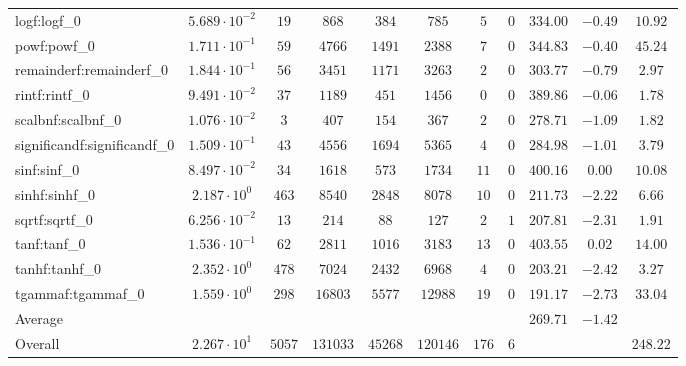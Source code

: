 \begin{tabular}{|l|c|c|c|c|c|c|c|c|c|c|}
logf:logf\_0                 & $ 5.689 \cdot 10^{-2} $ & $ 19     $ & $ 868    $ & $ 384   $ & $ 785    $ & $ 5   $ & $ 0 $ & $ 334.00      $ & $ -0.49   $ & $ 10.92   $ \\
powf:powf\_0                 & $ 1.711 \cdot 10^{-1} $ & $ 59     $ & $ 4766   $ & $ 1491  $ & $ 2388   $ & $ 7   $ & $ 0 $ & $ 344.83      $ & $ -0.40   $ & $ 45.24   $ \\
remainderf:remainderf\_0     & $ 1.844 \cdot 10^{-1} $ & $ 56     $ & $ 3451   $ & $ 1171  $ & $ 3263   $ & $ 2   $ & $ 0 $ & $ 303.77      $ & $ -0.79   $ & $ 2.97    $ \\
rintf:rintf\_0               & $ 9.491 \cdot 10^{-2} $ & $ 37     $ & $ 1189   $ & $ 451   $ & $ 1456   $ & $ 0   $ & $ 0 $ & $ 389.86      $ & $ -0.06   $ & $ 1.78    $ \\
scalbnf:scalbnf\_0           & $ 1.076 \cdot 10^{-2} $ & $ 3      $ & $ 407    $ & $ 154   $ & $ 367    $ & $ 2   $ & $ 0 $ & $ 278.71      $ & $ -1.09   $ & $ 1.82    $ \\
significandf:significandf\_0 & $ 1.509 \cdot 10^{-1} $ & $ 43     $ & $ 4556   $ & $ 1694  $ & $ 5365   $ & $ 4   $ & $ 0 $ & $ 284.98      $ & $ -1.01   $ & $ 3.79    $ \\
sinf:sinf\_0                 & $ 8.497 \cdot 10^{-2} $ & $ 34     $ & $ 1618   $ & $ 573   $ & $ 1734   $ & $ 11  $ & $ 0 $ & $ 400.16      $ & $ 0.00    $ & $ 10.08   $ \\
sinhf:sinhf\_0               & $ 2.187 \cdot 10^{0}  $ & $ 463    $ & $ 8540   $ & $ 2848  $ & $ 8078   $ & $ 10  $ & $ 0 $ & $ 211.73      $ & $ -2.22   $ & $ 6.66    $ \\
sqrtf:sqrtf\_0               & $ 6.256 \cdot 10^{-2} $ & $ 13     $ & $ 214    $ & $ 88    $ & $ 127    $ & $ 2   $ & $ 1 $ & $ 207.81      $ & $ -2.31   $ & $ 1.91    $ \\
tanf:tanf\_0                 & $ 1.536 \cdot 10^{-1} $ & $ 62     $ & $ 2811   $ & $ 1016  $ & $ 3183   $ & $ 13  $ & $ 0 $ & $ 403.55      $ & $ 0.02    $ & $ 14.00   $ \\
tanhf:tanhf\_0               & $ 2.352 \cdot 10^{0}  $ & $ 478    $ & $ 7024   $ & $ 2432  $ & $ 6968   $ & $ 4   $ & $ 0 $ & $ 203.21      $ & $ -2.42   $ & $ 3.27    $ \\
tgammaf:tgammaf\_0           & $ 1.559 \cdot 10^{0}  $ & $ 298    $ & $ 16803  $ & $ 5577  $ & $ 12988  $ & $ 19  $ & $ 0 $ & $ 191.17      $ & $ -2.73   $ & $ 33.04   $ \\
\hline
Average                      & $                     $ & $        $ & $        $ & $       $ & $        $ & $     $ & $   $ & $ 269.71      $ & $ -1.42   $ & $         $ \\
\hline
Overall                      & $ 2.267 \cdot 10^{1}  $ & $ 5057   $ & $ 131033 $ & $ 45268 $ & $ 120146 $ & $ 176 $ & $ 6 $ & $             $ & $         $ & $ 248.22  $ \\
\hline
\end{tabular}
